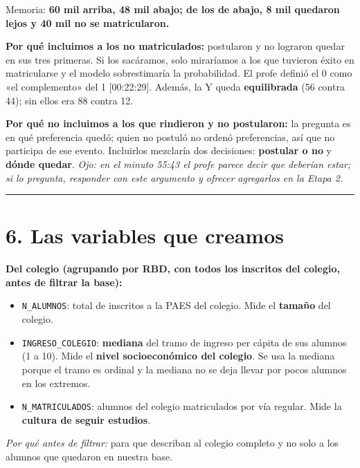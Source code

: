 \documentclass[11pt]{article}
\begin{document}
Memoria: \textbf{60 mil arriba, 48 mil abajo; de los de abajo, 8 mil quedaron lejos y 40 mil no se matricularon.}\par

\textbf{Por qué incluimos a los no matriculados:} postularon y no lograron quedar en sus tres primeras. Si los sacáramos, solo miraríamos a los que tuvieron éxito en matricularse y el modelo sobrestimaría la probabilidad. El profe definió el 0 como «el complemento» del 1 [00:22:29]. Además, la Y queda \textbf{equilibrada} (56 contra 44); sin ellos era 88 contra 12.\par

\textbf{Por qué no incluimos a los que rindieron y no postularon:} la pregunta es en qué preferencia quedó; quien no postuló no ordenó preferencias, así que no participa de ese evento. Incluirlos mezclaría dos decisiones: \textbf{postular o no} y \textbf{dónde quedar}. \textit{Ojo: en el minuto 55:43 el profe parece decir que deberían estar; si lo pregunta, responder con este argumento y ofrecer agregarlos en la Etapa 2.}\par

\medskip\hrule\medskip

\section*{6. Las variables que creamos}

\textbf{Del colegio (agrupando por RBD, con todos los inscritos del colegio, antes de filtrar la base):}\par
\begin{itemize}
\item \texttt{N\_ALUMNOS}: total de inscritos a la PAES del colegio. Mide el \textbf{tamaño} del colegio.
\item \texttt{INGRESO\_COLEGIO}: \textbf{mediana} del tramo de ingreso per cápita de sus alumnos (1 a 10). Mide el \textbf{nivel socioeconómico del colegio}. Se usa la mediana porque el tramo es ordinal y la mediana no se deja llevar por pocos alumnos en los extremos.
\item \texttt{N\_MATRICULADOS}: alumnos del colegio matriculados por vía regular. Mide la \textbf{cultura de seguir estudios}.
\end{itemize}

\textit{Por qué antes de filtrar:} para que describan al colegio completo y no solo a los alumnos que quedaron en nuestra base.\par
\end{document}
